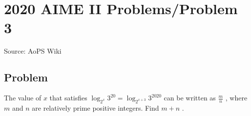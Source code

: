 \documentclass[12pt]{article}
\begin{document}
\section*{{2020 AIME II Problems/Problem 3}}
Source: AoPS Wiki

\subsection*{Problem}
The value of $x$ that satisfies $\log_{2^x} 3^{20} = \log_{2^{x+3}} 3^{2020}$ can be written as $\frac{m}{n}$ , where $m$ and $n$ are relatively prime positive integers. Find $m+n$ .
\end{document}
